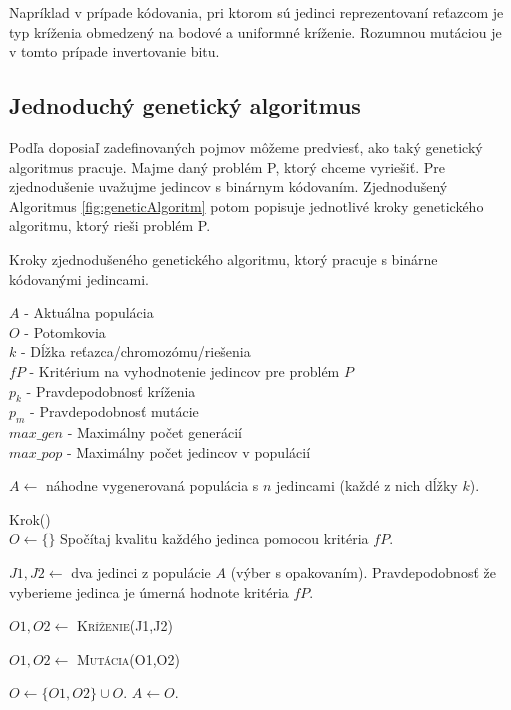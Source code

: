 Napríklad v prípade kódovania, pri ktorom sú jedinci reprezentovaní reťazcom je typ kríženia obmedzený na bodové a uniformné kríženie. Rozumnou mutáciou je v tomto prípade invertovanie bitu.

\subsection{Jednoduchý genetický algoritmus}
Podľa doposiaľ zadefinovaných pojmov môžeme predviesť, ako taký genetický algoritmus pracuje. Majme daný problém P, ktorý chceme vyriešiť. Pre zjednodušenie uvažujme jedincov s binárnym kódovaním. Zjednodušený Algoritmus \ref{fig:geneticAlgoritm} potom popisuje jednotlivé kroky genetického algoritmu, ktorý rieši problém P.
\begin{algorithm}
\caption{Kroky zjednodušeného genetického algoritmu, ktorý pracuje s binárne kódovanými jedincami.}\label{fig:geneticAlgoritm}
$A$ - Aktuálna populácia \\
$O$ - Potomkovia \\
$k$ - Dĺžka reťazca/chromozómu/riešenia \\
$fP$ - Kritérium na vyhodnotenie jedincov pre problém $P$\\
$p_{k}$ - Pravdepodobnosť kríženia \\
$p_{m}$ - Pravdepodobnosť mutácie \\
$max\_gen$ - Maximálny počet generácií \\
$max\_pop$ - Maximálny počet jedincov v populácií \\
\begin{algorithmic}

\State \parbox[t]{400pt}{$A \gets $ náhodne vygenerovaná populácia s $n$ jedincami (každé z nich dĺžky $k$).}

	\State Krok()
\EndFor
\\
	\State $O \gets \{\}$
	\State Spočítaj kvalitu každého jedinca pomocou kritéria $fP$.	
		\State \parbox[t]{350pt}{$J1,J2 \gets $ dva jedinci z populácie $A$ (výber s opakovaním). Pravdepodobnosť že vyberieme jedinca je úmerná hodnote kritéria $fP$.}
		\State \parbox[t]{350pt}{$O1,O2 \gets $ \textsc{Kríženie(J1,J2)}}
		\State \parbox[t]{350pt}{$O1,O2 \gets $ \textsc{Mutácia(O1,O2)}}
		\State $O \gets \{O1,O2\} \cup O$.
	\EndWhile
	\State $A \gets O$.
\EndProcedure
\\
 \\
\EndFunction
\\
 \\
\EndFunction
\end{algorithmic}
\end{algorithm}
